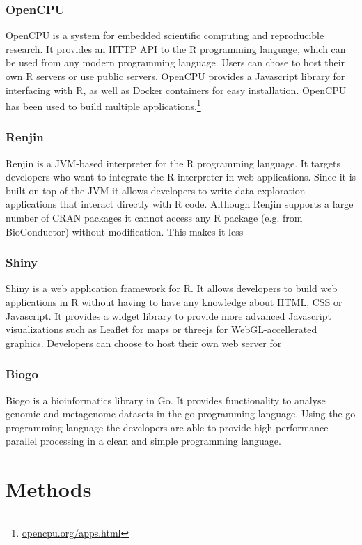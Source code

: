 \subsubsection*{OpenCPU} 
OpenCPU is a system for embedded scientific computing and reproducible
research.\cite{opencpu} It provides an HTTP API to the R programming language,
which can be used from any modern programming language. Users can chose to host
their own R servers or use public servers. 
OpenCPU provides a Javascript library for interfacing with R, as well as Docker
containers for easy installation. OpenCPU has been used to build multiple
applications.\footnote{\url{opencpu.org/apps.html}}

\subsubsection*{Renjin} 
Renjin is a JVM-based interpreter for the R programming language.\cite{renjin}
It targets developers who want to integrate the R interpreter in web
applications.  Since it is built on top of the JVM it allows developers to write
data exploration applications that interact directly with R code. Although
Renjin supports a large number of CRAN packages it cannot access any R package
(e.g. from BioConductor) without modification. This makes it less 

\subsubsection*{Shiny} 
Shiny is a web application framework for R.\cite{shiny} It allows developers to
build web applications in R without having to have any knowledge about HTML, CSS
or Javascript. It provides a widget library to provide more advanced Javascript
visualizations such as Leaflet for maps or threejs for WebGL-accellerated
graphics. Developers can choose to host their own web server for  

\subsubsection*{Biogo} 
Biogo is a bioinformatics library in Go. It provides functionality to analyse
genomic and metagenomc datasets in the go programming
language.\cite{Kortschak005033} Using the go programming language the developers
are able to provide high-performance parallel processing in a clean and simple
programming language. 


\section*{Methods} 
